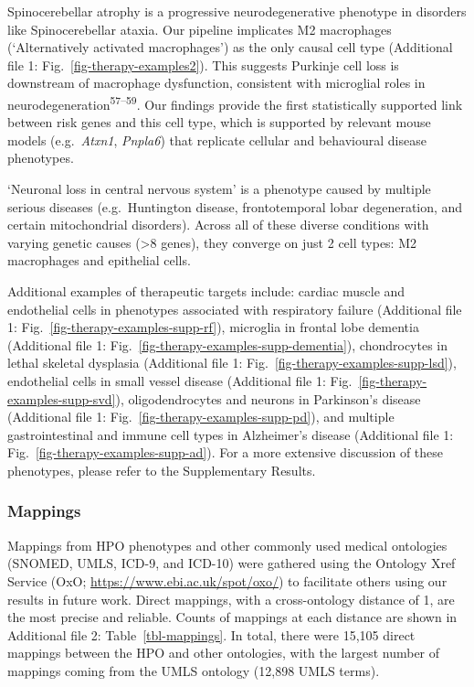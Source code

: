 \documentclass[
]{article}
\begin{document}
Spinocerebellar atrophy is a progressive neurodegenerative phenotype in
disorders like Spinocerebellar ataxia. Our pipeline implicates M2
macrophages (`Alternatively activated macrophages') as the only causal
cell type (Additional file 1: Fig.~\ref{fig-therapy-examples2}). This
suggests Purkinje cell loss is downstream of macrophage dysfunction,
consistent with microglial roles in
neurodegeneration\textsuperscript{57--59}. Our findings provide the
first statistically supported link between risk genes and this cell
type, which is supported by relevant mouse models (e.g.~\emph{Atxn1},
\emph{Pnpla6}) that replicate cellular and behavioural disease
phenotypes.

`Neuronal loss in central nervous system' is a phenotype caused by
multiple serious diseases (e.g.~Huntington disease, frontotemporal lobar
degeneration, and certain mitochondrial disorders). Across all of these
diverse conditions with varying genetic causes (\textgreater8 genes),
they converge on just 2 cell types: M2 macrophages and epithelial cells.

Additional examples of therapeutic targets include: cardiac muscle and
endothelial cells in phenotypes associated with respiratory failure
(Additional file 1: Fig.~\ref{fig-therapy-examples-supp-rf}), microglia
in frontal lobe dementia (Additional file 1:
Fig.~\ref{fig-therapy-examples-supp-dementia}), chondrocytes in lethal
skeletal dysplasia (Additional file 1:
Fig.~\ref{fig-therapy-examples-supp-lsd}), endothelial cells in small
vessel disease (Additional file 1:
Fig.~\ref{fig-therapy-examples-supp-svd}), oligodendrocytes and neurons
in Parkinson's disease (Additional file 1:
Fig.~\ref{fig-therapy-examples-supp-pd}), and multiple gastrointestinal
and immune cell types in Alzheimer's disease (Additional file 1:
Fig.~\ref{fig-therapy-examples-supp-ad}). For a more extensive
discussion of these phenotypes, please refer to the Supplementary
Results.

\subsubsection{Mappings}\label{mappings-1}

Mappings from HPO phenotypes and other commonly used medical ontologies
(SNOMED, UMLS, ICD-9, and ICD-10) were gathered using the Ontology Xref
Service (OxO; \url{https://www.ebi.ac.uk/spot/oxo/}) to facilitate
others using our results in future work. Direct mappings, with a
cross-ontology distance of 1, are the most precise and reliable. Counts
of mappings at each distance are shown in Additional file 2:
Table~\ref{tbl-mappings}. In total, there were 15,105 direct mappings
between the HPO and other ontologies, with the largest number of
mappings coming from the UMLS ontology (12,898 UMLS terms).
\end{document}
